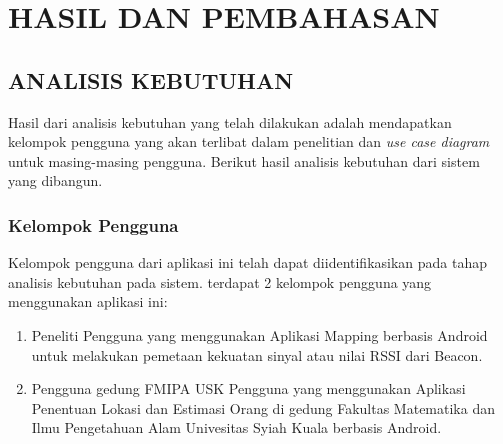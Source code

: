 \fancyhf{}
\fancyfoot[C]{\thepage}
\chapter{HASIL DAN PEMBAHASAN}
\section{\uppercase{ANALISIS KEBUTUHAN}}

Hasil dari analisis kebutuhan yang telah dilakukan adalah mendapatkan kelompok pengguna yang akan terlibat dalam penelitian dan \textit{use case diagram} untuk masing-masing pengguna. Berikut hasil analisis kebutuhan dari sistem yang dibangun.

\subsection{Kelompok Pengguna}
Kelompok pengguna dari aplikasi ini telah dapat diidentifikasikan pada tahap analisis kebutuhan pada sistem. terdapat 2 kelompok pengguna yang menggunakan aplikasi ini:
\begin{enumerate}[1.]
	\item Peneliti
	      \newline Pengguna yang menggunakan Aplikasi Mapping berbasis Android untuk melakukan pemetaan kekuatan sinyal atau nilai RSSI dari Beacon.
	\item Pengguna gedung FMIPA USK
	      \newline Pengguna yang menggunakan Aplikasi Penentuan Lokasi dan Estimasi Orang di gedung Fakultas Matematika dan Ilmu Pengetahuan Alam Univesitas Syiah Kuala berbasis Android.
\end{enumerate}

